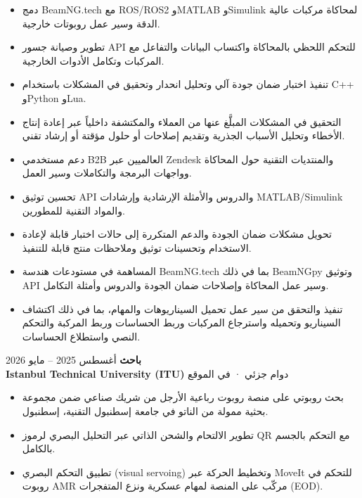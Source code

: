 \documentclass[11pt,a4paper]{article}
\newcommand{\en}[1]{\textenglish{#1}}
\begin{document}
\begin{itemize}
    \item دمج \en{BeamNG.tech} مع \en{ROS/ROS2} و\en{MATLAB} و\en{Simulink} لمحاكاة مركبات عالية الدقة وسير عمل روبوتات خارجية.
    \item تطوير وصيانة جسور \en{API} للتحكم اللحظي بالمحاكاة واكتساب البيانات والتفاعل مع المركبات وتكامل الأدوات الخارجية.
    \item تنفيذ اختبار ضمان جودة آلي وتحليل انحدار وتحقيق في المشكلات باستخدام \en{C++} و\en{Python} و\en{Lua}.
    \item التحقيق في المشكلات المبلَّغ عنها من العملاء والمكتشفة داخلياً عبر إعادة إنتاج الأخطاء وتحليل الأسباب الجذرية وتقديم إصلاحات أو حلول مؤقتة أو إرشاد تقني.
    \item دعم مستخدمي \en{B2B} العالميين عبر \en{Zendesk} والمنتديات التقنية حول المحاكاة وواجهات البرمجة والتكاملات وسير العمل.
    \item تحسين توثيق \en{API} والدروس والأمثلة الإرشادية وإرشادات \en{MATLAB/Simulink} والمواد التقنية للمطورين.
    \item تحويل مشكلات ضمان الجودة والدعم المتكررة إلى حالات اختبار قابلة لإعادة الاستخدام وتحسينات توثيق وملاحظات منتج قابلة للتنفيذ.
    \item المساهمة في مستودعات هندسة \en{BeamNG.tech} بما في ذلك \en{BeamNGpy} وتوثيق \en{API} وسير عمل المحاكاة وإصلاحات ضمان الجودة والدروس وأمثلة التكامل.
    \item تنفيذ والتحقق من سير عمل تحميل السيناريوهات والمهام، بما في ذلك اكتشاف السيناريو وتحميله واسترجاع المركبات وربط الحساسات وربط المركبة والتحكم النصي واستطلاع الحساسات.
\end{itemize}

\textbf{باحث} \hfill أغسطس 2025 -- مايو 2026\\
\textbf{\en{Istanbul Technical University (ITU)}} \hfill دوام جزئي · في الموقع

\begin{itemize}
    \item بحث روبوتي على منصة روبوت رباعية الأرجل من شريك صناعي ضمن مجموعة بحثية ممولة من الناتو في جامعة إسطنبول التقنية، إسطنبول.
    \item تطوير الالتحام والشحن الذاتي عبر التحليل البصري لرموز \en{QR} مع التحكم بالجسم بالكامل.
    \item تطبيق التحكم البصري (\en{visual servoing}) وتخطيط الحركة عبر \en{MoveIt} للتحكم في روبوت \en{AMR} مركّب على المنصة لمهام عسكرية ونزع المتفجرات (\en{EOD}).
\end{itemize}
\end{document}
